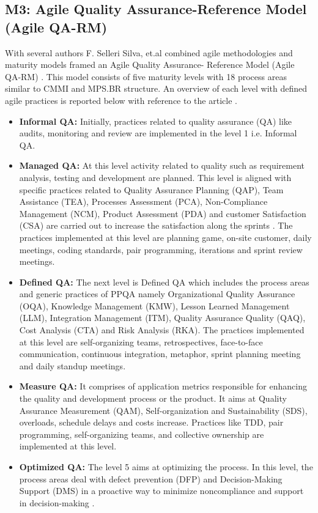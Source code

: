 \documentclass[a4paper,oneside]{bth}
\begin{document}
\subsection{M3: Agile Quality Assurance-Reference Model (Agile QA-RM)}
With several authors F. Selleri Silva, et.al combined agile methodologies and maturity models framed an Agile Quality Assurance- Reference Model (Agile QA-RM) \cite{selleri_silva_reference_2014}. This model consists of five maturity levels with 18 process areas similar to CMMI and MPS.BR structure. An overview of each level with defined agile practices is reported below with reference to the article \cite{selleri_silva_reference_2014}.
\begin{itemize}
\item \textbf{Informal QA:} Initially, practices related to quality assurance (QA) like audits, monitoring and review are implemented in the level 1 i.e. Informal QA.
\item \textbf{Managed QA:} At this level activity related to quality such as requirement analysis, testing and development are planned. This level is aligned with specific practices related to Quality Assurance Planning (QAP), Team Assistance (TEA), Processes Assessment (PCA), Non-Compliance Management (NCM), Product Assessment (PDA) and customer Satisfaction (CSA) are carried out to increase the satisfaction along the sprints \cite{selleri_silva_reference_2014}. The practices implemented at this level are planning game, on-site customer, daily meetings, coding standards, pair programming, iterations and sprint review meetings.
\item \textbf{Defined QA:} The next level is Defined QA which includes the process areas and generic practices of PPQA namely Organizational Quality Assurance (OQA), Knowledge Management (KMW), Lesson Learned Management (LLM), Integration Management (ITM), Quality Assurance Quality (QAQ), Cost Analysis (CTA) and Risk Analysis (RKA). The practices implemented at this level are self-organizing teams, retrospectives, face-to-face communication, continuous integration, metaphor, sprint planning meeting and daily standup meetings.
\item \textbf{Measure QA:} It comprises of application metrics responsible for enhancing the quality and development process or the product. It aims at Quality Assurance Measurement (QAM), Self-organization and Sustainability (SDS), overloads, schedule delays and costs increase. Practices like TDD, pair programming, self-organizing teams, and collective ownership are implemented at this level.
\item \textbf{Optimized QA:} The level 5 aims at optimizing the process. In this level, the process areas deal with defect prevention (DFP) and Decision-Making Support (DMS) in a proactive way to minimize noncompliance and support in decision-making \cite{selleri_silva_reference_2014}.
\end{itemize}
\end{document}
